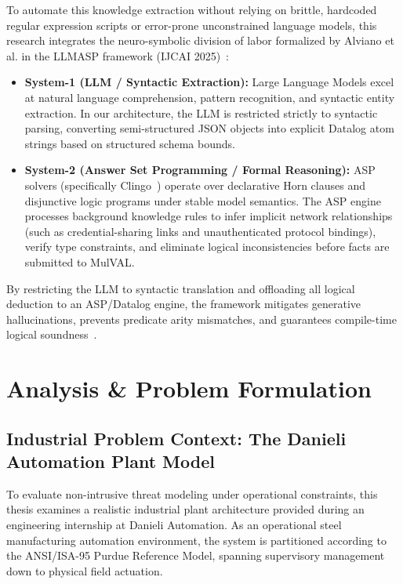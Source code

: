 \documentclass[target=mst,aauheader=aics,style=]{thud}
\begin{document}
To automate this knowledge extraction without relying on brittle, hardcoded regular expression scripts or error-prone unconstrained language models, this research integrates the neuro-symbolic division of labor formalized by Alviano et al. in the LLMASP framework (IJCAI 2025)~\cite{alviano2025llmasp}:
\begin{itemize}
    \item \textbf{System-1 (LLM / Syntactic Extraction):} Large Language Models excel at natural language comprehension, pattern recognition, and syntactic entity extraction. In our architecture, the LLM is restricted strictly to syntactic parsing, converting semi-structured JSON objects into explicit Datalog atom strings based on structured schema bounds.
    \item \textbf{System-2 (Answer Set Programming / Formal Reasoning):} ASP solvers (specifically Clingo~\cite{clingo}) operate over declarative Horn clauses and disjunctive logic programs under stable model semantics. The ASP engine processes background knowledge rules to infer implicit network relationships (such as credential-sharing links and unauthenticated protocol bindings), verify type constraints, and eliminate logical inconsistencies before facts are submitted to MulVAL.
\end{itemize}

By restricting the LLM to syntactic translation and offloading all logical deduction to an ASP/Datalog engine, the framework mitigates generative hallucinations, prevents predicate arity mismatches, and guarantees compile-time logical soundness~\cite{alviano2025llmasp}.

\chapter{Analysis \& Problem Formulation}
\label{chap:analysis}

\section{Industrial Problem Context: The Danieli Automation Plant Model}
To evaluate non-intrusive threat modeling under operational constraints, this thesis examines a realistic industrial plant architecture provided during an engineering internship at Danieli Automation. As an operational steel manufacturing automation environment, the system is partitioned according to the ANSI/ISA-95 Purdue Reference Model, spanning supervisory management down to physical field actuation.
\end{document}
